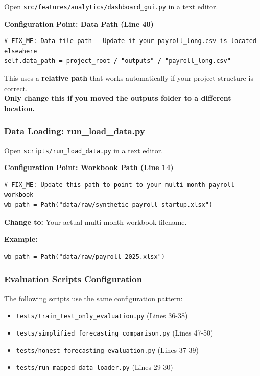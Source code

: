 \documentclass[11pt,a4paper]{article}
\begin{document}
Open \texttt{src/features/analytics/dashboard\_gui.py} in a text editor.

\textbf{Configuration Point: Data Path (Line 40)}

\begin{lstlisting}[style=pythonstyle, caption=Dashboard Data Path]
# FIX_ME: Data file path - Update if your payroll_long.csv is located elsewhere
self.data_path = project_root / "outputs" / "payroll_long.csv"
\end{lstlisting}

\begin{infobox}[title=Default Path]
This uses a \textbf{relative path} that works automatically if your project structure is correct.\\[0.2cm]
\textbf{Only change this if you moved the outputs folder to a different location.}
\end{infobox}

\subsubsection{Data Loading: run\_load\_data.py}

Open \texttt{scripts/run\_load\_data.py} in a text editor.

\textbf{Configuration Point: Workbook Path (Line 14)}

\begin{lstlisting}[style=pythonstyle, caption=Multi-Month Workbook Path]
# FIX_ME: Update this path to point to your multi-month payroll workbook
wb_path = Path("data/raw/synthetic_payroll_startup.xlsx")
\end{lstlisting}

\textbf{Change to:} Your actual multi-month workbook filename.

\textbf{Example:}
\begin{lstlisting}[style=pythonstyle]
wb_path = Path("data/raw/payroll_2025.xlsx")
\end{lstlisting}

\subsubsection{Evaluation Scripts Configuration}

The following scripts use the same configuration pattern:

\begin{itemize}
    \item \texttt{tests/train\_test\_only\_evaluation.py} (Lines 36-38)
    \item \texttt{tests/simplified\_forecasting\_comparison.py} (Lines 47-50)
    \item \texttt{tests/honest\_forecasting\_evaluation.py} (Lines 37-39)
    \item \texttt{tests/run\_mapped\_data\_loader.py} (Lines 29-30)
\end{itemize}
\end{document}
